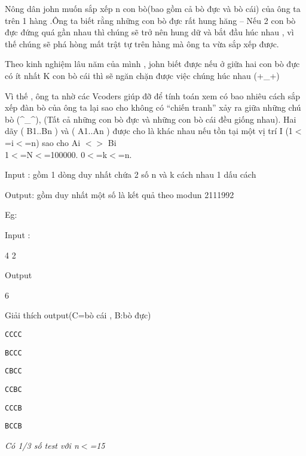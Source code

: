 



   Nông dân john muốn sắp xếp n con bò(bao gồm cả bò đực và bò cái) của ông ta trên 1 hàng .Ông ta biết rằng những con bò đực rất hung hăng – Nếu 2 con bò đực đứng quá gần nhau thì chúng sẽ trở nên hung dữ và bắt đầu húc nhau , vì thế chúng sẽ phá hòng mất trật tự trên hàng mà ông ta vừa sắp xếp được.  

   Theo kinh nghiệm lâu năm của mình , john biết được nếu ở giữa hai con bò đực có ít nhất K con bò cái thì sẽ ngăn chặn được việc chúng húc nhau (+\_+)  

   Vì thế , ông ta nhờ các Vcoders giúp đỡ để tính toán xem có bao nhiêu cách sắp xếp đàn bò của ông ta lại sao cho không có “chiến tranh” xảy ra giữa những chú bò (\textasciicircum\_\textasciicircum), (Tất cả những con bò đực và những con bò cái đều giống nhau). Hai dãy (       B1..Bn       ) và (       A1..An       ) được cho là khác nhau nếu tồn tại một vị trí I (1$<$=i$<$=n) sao cho       Ai $<$$>$ Bi    
\\

   1$<$=N$<$=100000. 0$<$=k$<$=n.  

   Input : gồm 1 dòng duy nhất chứa 2 số n và k cách nhau 1 dấu cách  

   Output: gồm duy nhất một số là kết quả theo modun 2111992  



   Eg:  

   Input :  



   4 2  



   Output  



   6  



   Giải thích output(C=bò cái , B:bò đực)  
\begin{verbatim}
CCCC\end{verbatim}
\begin{verbatim}
BCCC\end{verbatim}
\begin{verbatim}
CBCC\end{verbatim}
\begin{verbatim}
CCBC\end{verbatim}
\begin{verbatim}
CCCB\end{verbatim}
\begin{verbatim}
BCCB\end{verbatim}

\emph{    Có 1/3 số test với n$<$=15   }